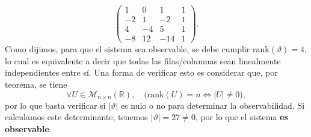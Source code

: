 \documentclass[
  11pt,
  letterpaper,
   addpoints,
   answers
  ]{exam}
\begin{document}
\begin{questions}
\begin{solution}
\begin{equation}
\begin{pmatrix}
1&0&1&1\\
-2&1&-2&1\\
4&-4&5&1\\
-8&12&-14&1
\end{pmatrix}.
\end{equation}
Como dijimos, para que el sistema sea observable, se debe cumplir $\mathrm{rank}(\vartheta)=4$, lo cual es equivalente a decir que todas las filas/columnas sean linealmente independientes entre sí. Una forma de verificar esto es considerar que, por teorema, se tiene
\begin{equation}
\forall U\in \mathcal{M}_{n\times n}(\mathbb{R}),\quad
\big(\mathrm{rank}(U)=n \Leftrightarrow |U|\neq 0\big),
\end{equation}
por lo que basta verificar si $|\vartheta|$ es nulo o no para determinar la observabilidad. Si calculamos este determinante, tenemos $|\vartheta|=27\neq 0$, por lo que el sistema \textbf{es observable}.


\end{solution}
\end{questions}
\end{document}
